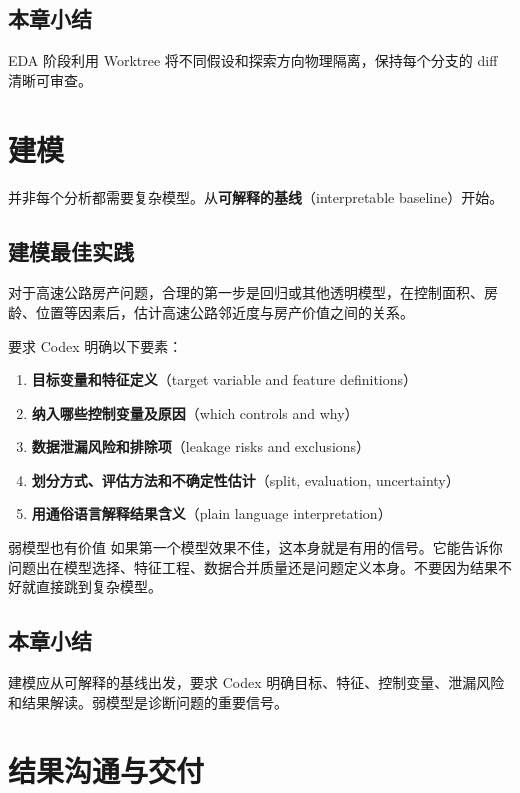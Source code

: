 \documentclass[a4paper]{article}
\begin{document}
\subsection{本章小结}
EDA 阶段利用 Worktree 将不同假设和探索方向物理隔离，保持每个分支的 diff 清晰可审查。

\section{建模}

并非每个分析都需要复杂模型。从\textbf{可解释的基线}（interpretable baseline）开始。

\subsection{建模最佳实践}

对于高速公路房产问题，合理的第一步是回归或其他透明模型，在控制面积、房龄、位置等因素后，估计高速公路邻近度与房产价值之间的关系。

要求 Codex 明确以下要素：

\begin{enumerate}[nosep]
    \item \textbf{目标变量和特征定义}（target variable and feature definitions）
    \item \textbf{纳入哪些控制变量及原因}（which controls and why）
    \item \textbf{数据泄漏风险和排除项}（leakage risks and exclusions）
    \item \textbf{划分方式、评估方法和不确定性估计}（split, evaluation, uncertainty）
    \item \textbf{用通俗语言解释结果含义}（plain language interpretation）
\end{enumerate}

\begin{warningbox}{弱模型也有价值}
如果第一个模型效果不佳，这本身就是有用的信号。它能告诉你问题出在模型选择、特征工程、数据合并质量还是问题定义本身。不要因为结果不好就直接跳到复杂模型。
\end{warningbox}

\subsection{本章小结}
建模应从可解释的基线出发，要求 Codex 明确目标、特征、控制变量、泄漏风险和结果解读。弱模型是诊断问题的重要信号。

\section{结果沟通与交付}
\end{document}
